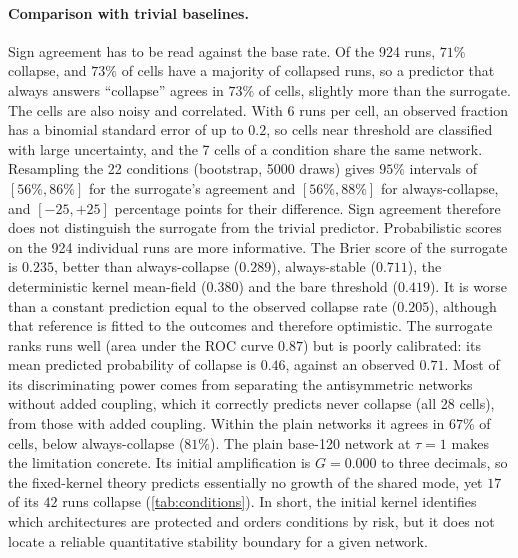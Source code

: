 \paragraph{Comparison with trivial baselines.}
Sign agreement has to be read against the base rate. Of the 924 runs, $71\%$ collapse, and $73\%$ of cells have a majority of collapsed runs, so a predictor that always answers ``collapse'' agrees in $73\%$ of cells, slightly more than the surrogate.
The cells are also noisy and correlated. With 6 runs per cell, an observed fraction has a binomial standard error of up to $0.2$, so cells near threshold are classified with large uncertainty, and the 7 cells of a condition share the same network. Resampling the 22 conditions (bootstrap, 5000 draws) gives $95\%$ intervals of $[56\%,86\%]$ for the surrogate's agreement and $[56\%,88\%]$ for always-collapse, and $[-25,+25]$ percentage points for their difference. Sign agreement therefore does not distinguish the surrogate from the trivial predictor.
Probabilistic scores on the 924 individual runs are more informative. The Brier score of the surrogate is $0.235$, better than always-collapse ($0.289$), always-stable ($0.711$), the deterministic kernel mean-field ($0.380$) and the bare threshold ($0.419$). It is worse than a constant prediction equal to the observed collapse rate ($0.205$), although that reference is fitted to the outcomes and therefore optimistic.
The surrogate ranks runs well (area under the ROC curve $0.87$) but is poorly calibrated: its mean predicted probability of collapse is $0.46$, against an observed $0.71$.
Most of its discriminating power comes from separating the antisymmetric networks without added coupling, which it correctly predicts never collapse (all 28 cells), from those with added coupling. Within the plain networks it agrees in $67\%$ of cells, below always-collapse ($81\%$).
The plain base-120 network at $\tau=1$ makes the limitation concrete. Its initial amplification is $G=0.000$ to three decimals, so the fixed-kernel theory predicts essentially no growth of the shared mode, yet $17$ of its $42$ runs collapse (\cref{tab:conditions}).
In short, the initial kernel identifies which architectures are protected and orders conditions by risk, but it does not locate a reliable quantitative stability boundary for a given network.


